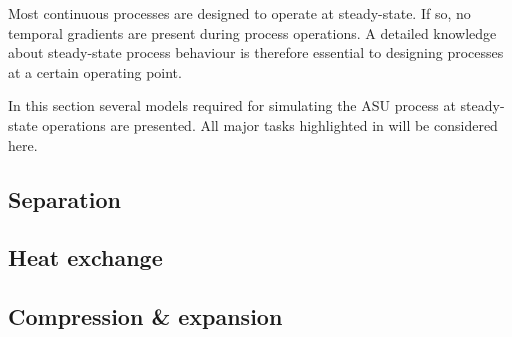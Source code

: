 Most continuous processes are designed to operate at steady-state. If so, no temporal gradients are present during
process operations. A detailed knowledge about steady-state process behaviour is therefore essential to designing 
processes at a certain operating point. 

In this section several models required for simulating the ASU process at steady-state operations are presented. 
All major tasks highlighted in  will be considered here. 
 
    \subsection{Separation}
    \label{sec:mathpro:steady:sep}
        

    \subsection{Heat exchange}
    \label{sec:mathpro:steady:hx}
        

    \subsection{Compression \& expansion}
    \label{sec:mathpro:steady:comp}
        